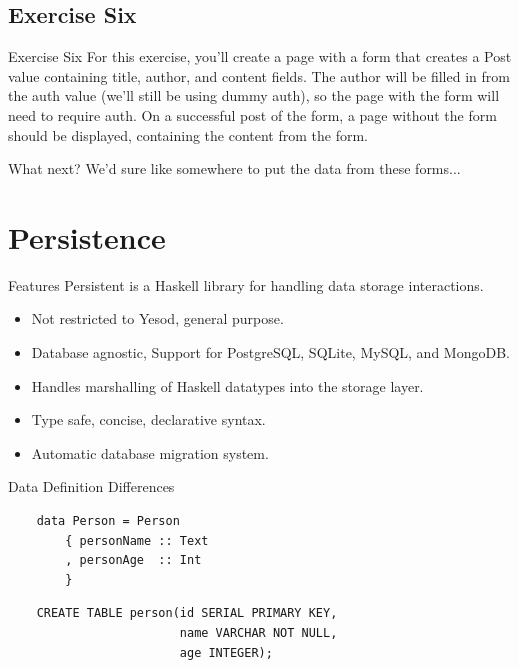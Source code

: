 \documentclass[pdf]{beamer}
\begin{document}
\subsection{Exercise Six}
\begin{frame}{Exercise Six}
  For this exercise, you'll create a page with a form that creates a
  Post value containing title, author, and content fields. The author
  will be filled in from the auth value (we'll still be using dummy
  auth), so the page with the form will need to require auth. On a
  successful post of the form, a page without the form should be
  displayed, containing the content from the form.
\end{frame}

\begin{frame}{What next?}
  We'd sure like somewhere to put the data from these forms...
\end{frame}

\section{Persistence}
\begin{frame}{Features}
  Persistent is a Haskell library for handling data storage interactions.
  \begin{itemize}
  \item<1-> Not restricted to Yesod, general purpose.
  \item<2-> Database agnostic, Support for PostgreSQL, SQLite, MySQL, and MongoDB.
  \item<3-> Handles marshalling of Haskell datatypes into the storage layer.
  \item<4-> Type safe, concise, declarative syntax.
  \item<5-> Automatic database migration system.
  \end{itemize}
\end{frame}

\begin{frame}[fragile]{Data Definition Differences}
  \begin{verbatim}
    data Person = Person
        { personName :: Text
        , personAge  :: Int
        }
  \end{verbatim}
  \pause
  \begin{verbatim}
    CREATE TABLE person(id SERIAL PRIMARY KEY,
                        name VARCHAR NOT NULL,
                        age INTEGER);
  \end{verbatim}
\end{frame}
\end{document}
